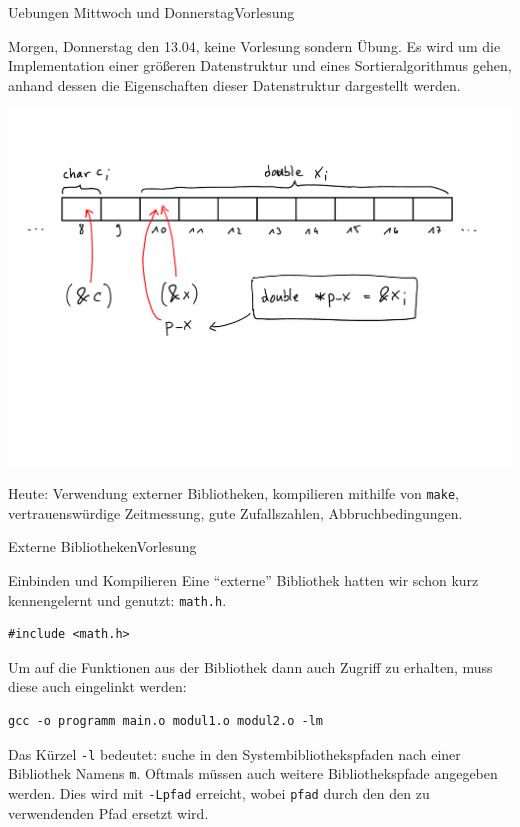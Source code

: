 \documentclass[xcolor=dvipsnames]{beamer}
\newcounter{lecturecounter}
\begin{document}

\begin{frame}[fragile]{Uebungen Mittwoch und Donnerstag}{Vorlesung }
\begin{block}{}
  Morgen, Donnerstag den 13.04, keine Vorlesung sondern Übung. Es wird um die Implementation einer größeren Datenstruktur und eines Sortieralgorithmus gehen, anhand dessen die Eigenschaften dieser Datenstruktur dargestellt werden.
\end{block}
\includegraphics[width=\textwidth,page=8,trim=0 9cm 0 2cm,clip=true]{graphics/c_kurs_tafel}
\begin{block}{}
  Heute: Verwendung externer Bibliotheken, kompilieren mithilfe von \verb|make|, vertrauenswürdige Zeitmessung, gute Zufallszahlen, Abbruchbedingungen.
\end{block}
\end{frame}

\begin{frame}[fragile]{Externe Bibliotheken}{Vorlesung }
\begin{block}{Einbinden und Kompilieren}
  Eine ``externe'' Bibliothek hatten wir schon kurz kennengelernt und genutzt: \verb|math.h|. 
\end{block}
\begin{lstlisting}
#include <math.h>
\end{lstlisting}
\begin{block}{}
Um auf die Funktionen aus der Bibliothek dann auch Zugriff zu erhalten, muss diese auch eingelinkt werden:
\begin{verbatim}
gcc -o programm main.o modul1.o modul2.o -lm 
\end{verbatim}
Das Kürzel \verb|-l| bedeutet: suche in den Systembibliothekspfaden nach einer Bibliothek Namens \verb|m|. Oftmals müssen auch weitere Bibliothekspfade angegeben werden. Dies wird mit \verb|-Lpfad| erreicht, wobei \verb|pfad| durch den den zu verwendenden Pfad ersetzt wird.
\end{block}
\end{frame}
\end{document}
